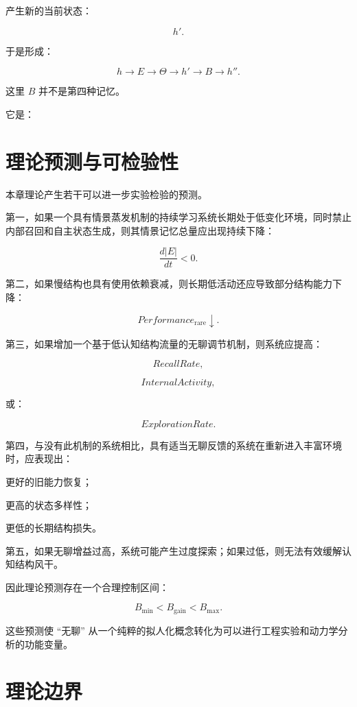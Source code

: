 产生新的当前状态：

\[
h'.
\]

于是形成：

\[
\boxed{
h
\rightarrow
E
\rightarrow
\Theta
\rightarrow
h'
\rightarrow
B
\rightarrow
h''.
}
\]

这里 $B$ 并不是第四种记忆。

它是：

\begin{statementbox}
\centering
{}
\end{statementbox}

\section{理论预测与可检验性}

本章理论产生若干可以进一步实验检验的预测。

第一，如果一个具有情景蒸发机制的持续学习系统长期处于低变化环境，同时禁止内部召回和自主状态生成，则其情景记忆总量应出现持续下降：

\[
\frac{d|E|}{dt}<0.
\]

第二，如果慢结构也具有使用依赖衰减，则长期低活动还应导致部分结构能力下降：

\[
Performance_{\mathrm{rare}}
\downarrow.
\]

第三，如果增加一个基于低认知结构流量的无聊调节机制，则系统应提高：

\[
RecallRate,
\]

\[
InternalActivity,
\]

或：

\[
ExplorationRate.
\]

第四，与没有此机制的系统相比，具有适当无聊反馈的系统在重新进入丰富环境时，应表现出：

更好的旧能力恢复；

更高的状态多样性；

更低的长期结构损失。

第五，如果无聊增益过高，系统可能产生过度探索；如果过低，则无法有效缓解认知结构风干。

因此理论预测存在一个合理控制区间：

\[
\boxed{
B_{\min}
<
B_{\mathrm{gain}}
<
B_{\max}.
}
\]

这些预测使 ``无聊'' 从一个纯粹的拟人化概念转化为可以进行工程实验和动力学分析的功能变量。

\section{理论边界}

